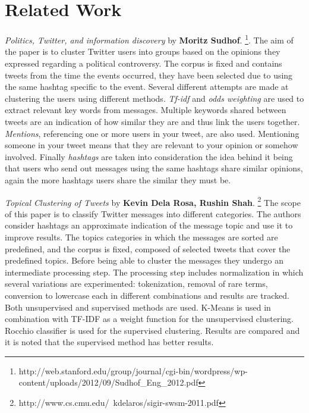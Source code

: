 \section{Related Work}
\label{sub-sec:rel-work}

\textit{Politics, Twitter, and information discovery} by \textbf{Moritz Sudhof}. \footnote{http://web.stanford.edu/group/journal/cgi-bin/wordpress/wp-content/uploads/2012/09/Sudhof_Eng_2012.pdf}.
\newline
The aim of the paper is to cluster Twitter users into groups based on the opinions they expressed regarding a political controversy. The corpus is fixed and contains tweets from the time the events occurred, they have been selected due to using the same hashtag specific to the event.
\newline
Several different attempts are made at clustering the users using different methods. \textit{Tf-idf} and \textit{odds weighting} are used to extract relevant key words from messages. Multiple keywords shared between tweets are an indication of how similar they are and thus link the users together. \textit{Mentions}, referencing one or more users in your tweet, are also used. Mentioning someone in your tweet means that they are relevant to your opinion or somehow involved.
\newline
Finally \textit{hashtags} are taken into consideration the idea behind it being that users who send out messages using the same hashtags share similar opinions, again the more hashtags users share the similar they must be.

\textit{Topical Clustering of Tweets} by \textbf{Kevin Dela Rosa, Rushin Shah}. \footnote{http://www.cs.cmu.edu/~kdelaros/sigir-swsm-2011.pdf}
\newline
The scope of this paper is to classify Twitter messages into different categories. The authors consider hashtags an approximate indication of the message topic and use it to improve results. The topics categories in which the messages are sorted are predefined, and the corpus is fixed, composed of selected tweets that cover the predefined topics.
\newline
Before being able to cluster the messages they undergo an intermediate processing step. The processing step includes normalization in which several variations are experimented: tokenization, removal of rare terms, conversion to lowercase each in different combinations and results are tracked.
\newline
Both unsupervised and supervised methods are used. K-Means is used in combination with TF-IDF as a weight function for the unsupervised clustering. Rocchio classifier is used for the supervised clustering. Results are compared and it is noted that the supervised method has better results.


